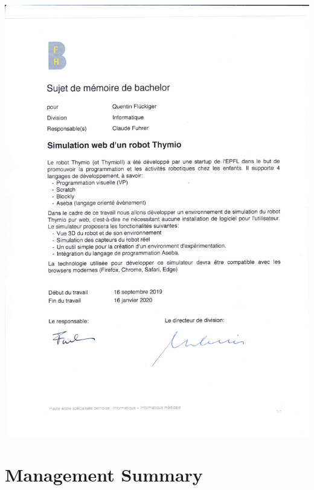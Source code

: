 \documentclass{scrreprt}
\begin{document}
\includegraphics[width=\textwidth]{pdf/bachelor_quentin.pdf}
\clearpage

\section*{Management Summary}
\end{document}
